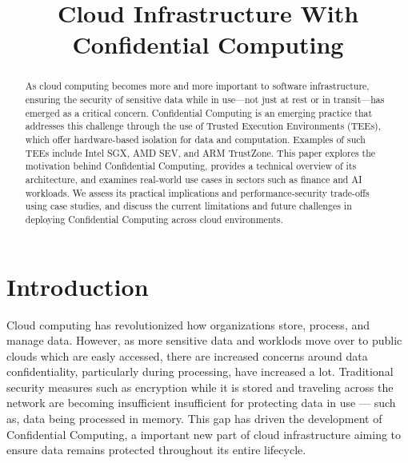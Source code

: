 \documentclass[conference]{IEEEtran}
\begin{document}
\title{Cloud Infrastructure With Confidential Computing}

\author{
}

\maketitle

\begin{abstract}
As cloud computing becomes more and more important to software infrastructure, 
ensuring the security of sensitive data while in use—not just at rest or in transit—has emerged 
as a critical concern. Confidential Computing is an emerging practice that addresses this challenge 
through the use of Trusted Execution Environments (TEEs), which offer hardware-based isolation for 
data and computation. Examples of such TEEs include Intel SGX\cite{intelSGX}, AMD SEV\cite{amdSEV}, 
and ARM TrustZone\cite{armTrustZone}. This paper 
explores the motivation behind Confidential Computing, provides a technical overview of its 
architecture, and examines real-world use cases in sectors such as finance and AI workloads. 
We assess 
its practical implications and performance-security trade-offs using case studies, and discuss the 
current limitations and future challenges in deploying Confidential Computing across cloud environments.
\end{abstract}

\section{Introduction}
Cloud computing has revolutionized how organizations store, process, and manage data. However, 
as more sensitive data and worklods move over to public clouds which are easly accessed, 
there are increased concerns around data 
confidentiality, particularly during processing, have increased a lot. Traditional security measures 
such as encryption while it is stored and traveling across the network 
are becoming insufficient insufficient for protecting data in use — such as, 
data being processed in memory. This gap has driven the development of Confidential Computing, 
a important new part of cloud infrastructure aiming to ensure data remains protected throughout its 
entire lifecycle.
\end{document}
